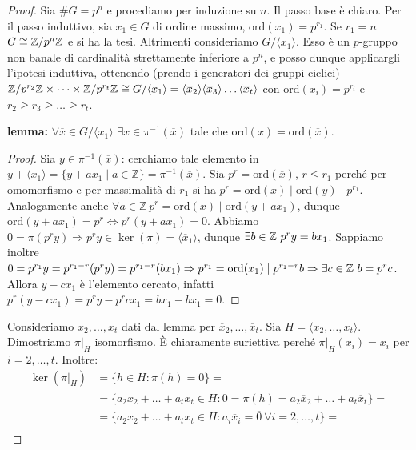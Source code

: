 \begin{proof}
    Sia $\#G = p^n$ e procediamo per induzione su $n$. Il passo base è chiaro.
    Per il passo induttivo, sia $ x_1 \in G$ di ordine massimo, $\text{ord}(x_1) = p^{r_1}$. Se $r_1 = n$ $G \cong \mathbb{Z}/p^n\mathbb{Z}$ e si ha la tesi. Altrimenti consideriamo $G/\langle x_1 \rangle$. Esso è un $p$-gruppo non banale di cardinalità strettamente inferiore a $p^n$, e posso dunque applicargli l'ipotesi induttiva, ottenendo (prendo i generatori dei gruppi ciclici) $\mathbb{Z}/p^{r_2}\mathbb{Z} \times \dots \times \mathbb{Z}/p^{r_t}\mathbb{Z} \cong G/\langle x_1 \rangle = \langle \overline x_2 \rangle \langle \overline x_3 \rangle \dots  \langle \overline x_t \rangle $ con $\text{ord}(x_i) = p^{r_i}$ e $r_2 \geq r_3 \geq \dots \geq r_t$.

    \textbf{lemma:} $\forall \overline x \in G/\langle x_1 \rangle$ $\exists x \in \pi^{-1}(\overline x)$ tale che $\text{ord}(x) = \text{ord}(\overline x)$.
    \begin{proof}
        Sia $y \in \pi^{-1}(\overline x)$: cerchiamo tale elemento in $y + \langle x_1 \rangle = \{y + a x_1 \mid a \in \mathbb{Z}\} = \pi^{-1}(\overline x)$. Sia $p^r = \text{ord}(\overline x)$, $r \leq r_1$ perché per omomorfismo e per massimalità di $r_1$ si ha $p^r = \text{ord}(\overline x) \mid \text{ord}(y) \mid p^{r_1}$. Analogamente anche $\forall a \in \mathbb{Z} \ p^r = \text{ord}(\overline x) \mid \text{ord}(y + a x_1)$, dunque $\text{ord}(y + a x_1) = p^r \Leftrightarrow p^r(y + a x_1) = 0$. Abbiamo $0 = \pi(p^r y) \Rightarrow p^r y \in \ker(\pi) = \langle \overline x_1 \rangle$, dunque $\exists b \in \mathbb{Z} \ p^ry = bx_1$. Sappiamo inoltre $0 = p^{r_1}y = p^{r_1-r}(p^r y) = p^{r_1-r}(b x_1) \Rightarrow p^{r_1} = \text{ord}(x_1) \mid p^{r_1-r}b \Rightarrow \exists c \in \mathbb{Z} \ b = p^rc$. Allora $y-cx_1$ è l'elemento cercato, infatti $p^r(y-cx_1) = p^ry - p^rcx_1 = b x_1 - bx_1 = 0$.
     \end{proof}
    Consideriamo $x_2, \dots, x_t$ dati dal lemma per $\overline x_2, \dots , \overline x_t$. Sia $H = \langle x_2,\dots, x_t \rangle$. Dimostriamo $\pi|_H$ isomorfismo. È chiaramente suriettiva perché $\pi|_H(x_i) = \overline x_i$ per $i=2,\dots,t$. Inoltre:
    \begin{align}
    \ker(\pi|_H) & = \{h \in H : \pi(h) = 0 \} =  \nonumber \\
    & = \{a_2 x_2+\dots+a_t x_t \in H :  \overline 0 = \pi(h) = a_2\overline x_2+\dots+a_t\overline x_t \}  =  \nonumber \\
    & =  \{a_2 x_2+\dots+a_t x_t \in H : a_i\overline x_i = \overline 0 \ \forall i = 2,\dots, t\}  = \nonumber \\

\end{align}
\end{proof}
